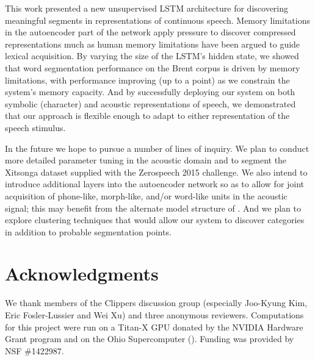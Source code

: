 \documentclass[11pt,letterpaper]{article}
\begin{document}
This work presented a new unsupervised LSTM architecture for discovering meaningful segments in representations of continuous speech.
Memory limitations in the autoencoder part of the network apply pressure to discover compressed representations much as human memory limitations have been argued to guide lexical acquisition.
By varying the size of the LSTM's hidden state, we showed that word segmentation performance on the Brent corpus is driven by memory limitations, with performance improving (up to a point) as we constrain the system's memory capacity.
And by successfully deploying our system on both symbolic (character) and acoustic representations of speech, we demonstrated that our approach is flexible enough to adapt to either representation of the speech stimulus.

In the future we hope to pursue a number of lines of inquiry.  We plan
to conduct more detailed parameter tuning in the acoustic domain and
to segment the Xitsonga dataset supplied with the Zerospeech 2015
challenge.  We also intend to introduce additional layers into the
autoencoder network so as to allow for joint acquisition of
phone-like, morph-like, and/or word-like units in the acoustic signal;
this may benefit from the alternate model structure of .
And we plan to explore clustering techniques that would allow our
system to discover categories in addition to probable segmentation
points.

\section*{Acknowledgments}

We thank members of the Clippers discussion group (especially
Joo-Kyung Kim, Eric Fosler-Lussier and Wei Xu) and three anonymous
reviewers. Computations for this project were run on a Titan-X GPU
donated by the NVIDIA Hardware Grant program and on the Ohio
Supercomputer (\citeyear{OhioSupercomputerCenter1987}). Funding was provided
by NSF \#1422987.




\end{document}

